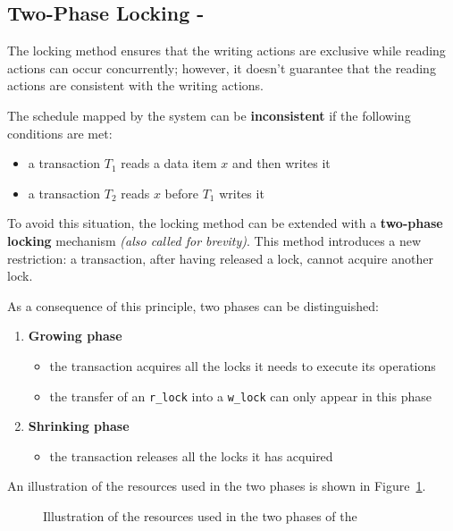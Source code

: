 \documentclass[english]{article}
\begin{document}
\subsection{Two-Phase Locking - \TPL}

The locking method ensures that the writing actions are exclusive while reading actions can occur concurrently;
however, it doesn't guarantee that the reading actions are consistent with the writing actions.

The schedule mapped by the \CC system can be \textbf{inconsistent} if the following conditions are met:

\begin{itemize}
  \item a transaction \(T_1\) reads a data item \(x\) and then writes it
  \item a transaction \(T_2\) reads \(x\) before \(T_1\) writes it
\end{itemize}

To avoid this situation, the locking method can be extended with a \textbf{two-phase locking} mechanism \textit{(also called
  \TPL for brevity)}.
This method introduces a new restriction: a transaction, after having released a lock, cannot acquire another lock.

As a consequence of this principle, two phases can be distinguished:

\begin{enumerate}
  \item \textbf{Growing phase}
        \begin{itemize}
          \item the transaction acquires all the locks it needs to execute its operations
          \item the transfer of an \texttt{r\_lock} into a \texttt{w\_lock} can only appear in this phase
        \end{itemize}
  \item \textbf{Shrinking phase}
        \begin{itemize}
          \item the transaction releases all the locks it has acquired
        \end{itemize}
\end{enumerate}

An illustration of the resources used in the two phases is shown in Figure~\ref{fig:resources-use-phases-two-phases-locking}.

\begin{figure}[htbp]
  \centering
  \bigskip
  \caption{Illustration of the resources used in the two phases of the \TPL}
  \label{fig:resources-use-phases-two-phases-locking}
  \bigskip
\end{figure}
\end{document}

